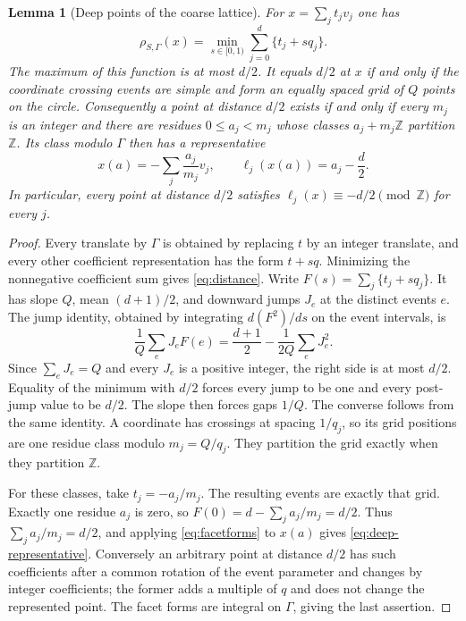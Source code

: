 \documentclass[11pt,a4paper]{article}
\newtheorem{lemma}[theorem]{Lemma}
\theoremstyle{remark}\newtheorem{remark}[theorem]{Remark}
\begin{document}
\begin{lemma}[Deep points of the coarse lattice]\label{eq:deep}
For $x=\sum_jt_jv_j$ one has
\begin{equation}\label{eq:distance}
 \rho_{S,\Gamma}(x)=\min_{s\in[0,1)}
                       \sum_{j=0}^{d}\{t_j+s q_j\}.
\end{equation}
The maximum of this function is at most $d/2$. It equals $d/2$
at $x$ if and only if the coordinate crossing events are simple and
form an equally spaced grid of $Q$ points on the circle.
Consequently a point at distance $d/2$ exists if and only if every $m_j$ is
an integer and there are residues $0\le a_j<m_j$ whose classes
$a_j+m_j\mathbb Z$ partition $\mathbb Z$. Its class modulo $\Gamma$
then has a representative
\begin{equation}\label{eq:deep-representative}
 x(a)=-\sum_j\frac{a_j}{m_j}v_j,
 \qquad \ell_j(x(a))=a_j-\frac d2.
\end{equation}
In particular, every point at distance $d/2$ satisfies
$\ell_j(x)\equiv-d/2\pmod{\mathbb Z}$ for every $j$.
\end{lemma}
\begin{proof}
Every translate by $\Gamma$ is obtained by replacing $t$ by an
integer translate, and every other coefficient representation has
the form $t+s q$. Minimizing the nonnegative coefficient sum gives
\eqref{eq:distance}. Write $F(s)=\sum_j\{t_j+s q_j\}$.
It has slope $Q$, mean $(d+1)/2$, and downward jumps $J_e$ at
the distinct events $e$. The jump identity, obtained by integrating
$d(F^2)/ds$ on the event intervals, is
\[
 \frac1Q\sum_e J_eF(e)
 =\frac{d+1}{2}-\frac1{2Q}\sum_eJ_e^2.
\]
Since $\sum_eJ_e=Q$ and every $J_e$ is a positive integer, the
right side is at most $d/2$. Equality of the minimum with $d/2$
forces every jump to be one and every post-jump value to be $d/2$.
The slope then forces gaps $1/Q$. The converse follows from the
same identity. A coordinate has crossings at spacing $1/q_j$,
so its grid positions are one residue class modulo $m_j=Q/q_j$.
They partition the grid exactly when they partition $\mathbb Z$.

For these classes, take $t_j=-a_j/m_j$. The resulting events
are exactly that grid. Exactly one residue $a_j$ is zero, so
$F(0)=d-\sum_j a_j/m_j=d/2$. Thus
$\sum_j a_j/m_j=d/2$, and applying \eqref{eq:facetforms} to
$x(a)$ gives \eqref{eq:deep-representative}. Conversely an arbitrary
point at distance $d/2$ has such coefficients after a common rotation of the
event parameter and changes by integer coefficients; the former
adds a multiple of $q$ and does not change the represented point.
The facet forms are integral on $\Gamma$, giving the last assertion.
\end{proof}
\end{document}

